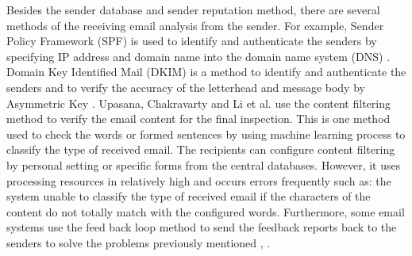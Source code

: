 \documentclass[conference]{IEEEtran}
\begin{document}
Besides the sender database and sender reputation method, there are several methods of the receiving email analysis from the sender. 
%
For example, Sender Policy Framework (SPF) is used to identify and authenticate the senders by specifying IP address and domain name into the domain name system (DNS) \cite{wong,NguyenTuanAnh,Seike}.
%
Domain Key Identified Mail (DKIM) is a method to identify and authenticate the senders and to verify the accuracy of the letterhead and message body by Asymmetric Key \cite{crocker,Leiba,Higashikado}.
%
Upasana, Chakravarty \cite{upasana} and Li et al. \cite{XiaoJunyong} use the content filtering method to verify the email content for the final inspection.
% 
This is one method used to check the words or formed sentences by using machine learning process to classify the type of received email. 
%
The recipients can configure content filtering by personal setting or specific forms from the central databases.
%
However, it uses processing resources in relatively high and occurs errors frequently such as:
%
the system unable to classify the type of received email if the characters of the content do not totally match with the configured words.
% 
Furthermore, some email systems use the feed back loop method to send the feedback reports back to the senders to solve the problems previously mentioned \cite{falk,}, \cite{}. 
\end{document}
